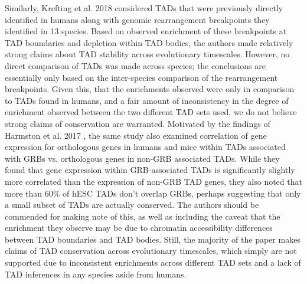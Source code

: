 Similarly, Krefting et al. 2018 \cite{Krefting.2018} considered TADs that were previously directly identified in humans \cite{Dixon.2012, Rao.2014} along with genomic rearrangement breakpoints they identified in 13 species. Based on observed enrichment of these breakpoints at TAD boundaries and depletion within TAD bodies, the authors made relatively strong claims about TAD stability across evolutionary timescales. However, no direct comparison of TADs was made across species; the conclusions are essentially only based on the inter-species comparison of the rearrangement breakpoints. Given this, that the enrichments observed were only in comparison to TADs found in humans, and a fair amount of inconsistency in the degree of enrichment observed between the two different TAD sets used, we do not believe strong claims of conservation are warranted. Motivated by the findings of Harmston et al. 2017 \cite{Harmston.2017}, the same study also examined correlation of gene expression for orthologous genes in humans and mice within TADs associated with GRBs vs. orthologous genes in non-GRB associated TADs. While they found that gene expression within GRB-associated TADs is significantly slightly more correlated than the expression of non-GRB TAD genes, they also noted that more than 60\% of hESC TADs don't overlap GRBs, perhaps suggesting that only a small subset of TADs are actually conserved. The authors should be commended for making note of this, as well as including the caveat that the enrichment they observe may be due to chromatin accessibility differences between TAD boundaries and TAD bodies. Still, the majority of the paper makes claims of TAD conservation across evolutionary timescales, which simply are not supported due to inconsistent enrichments across different TAD sets and a lack of TAD inferences in any species aside from humans.

